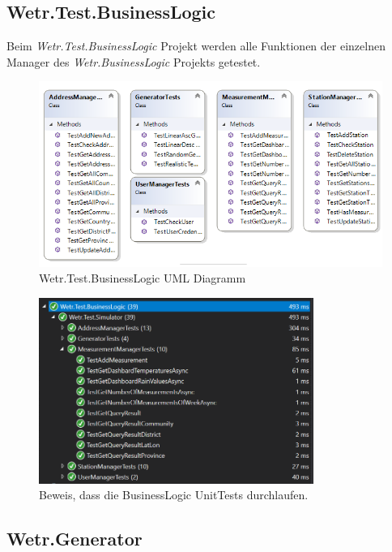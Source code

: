 \newpage
\subsection{Wetr.Test.BusinessLogic}
Beim \textit{Wetr.Test.BusinessLogic} Projekt werden alle Funktionen der einzelnen Manager des \textit{Wetr.BusinessLogic} Projekts getestet.

\begin{figure}[H]
\centering
\includegraphics[width=\textwidth]{pictures/Wetr_Test_BusinessLogic.png}
\caption{Wetr.Test.BusinessLogic UML Diagramm}
\label{fig:Wetr.Test.Dal}
\end{figure}
\raggedright

\begin{figure}[H]
\centering
\includegraphics[width=0.8\textwidth]{pictures/bl_tests.png}
\caption{Beweis, dass die BusinessLogic UnitTests durchlaufen.}
\end{figure}
\raggedright

\newpage
\subsection{Wetr.Generator}
\label{sec:generator}

